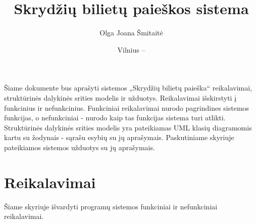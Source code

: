 \documentclass{VUMIFPSkursinis}
\title{Skrydžių bilietų paieškos sistema}
\author{Olga Joana Šmitaitė}
\date{Vilnius – \the\year}
\begin{document}
    \maketitle
      
        \tableofcontents
      
             Šiame dokumente bus aprašyti sistemos „Skrydžių bilietų paieška“ reikalavimai, struktūrinės dalykinės srities modelis ir užduotys. Reikalavimai išskirstyti į funkcinius ir nefunkcinius. Funkciniai reikalavimai nurodo pagrindines sistemos funkcijas, o nefunkciniai - nurodo kaip tas funkcijas sistema turi atlikti. Struktūrinės dalykinės srities modelis yra pateikiamas UML klasių diagramomis kartu su žodynais - sąrašu esybių su jų aprašymais. Paskutiniame skyriuje pateikiamos sistemos užduotys su jų aprašymais.
        \section{Reikalavimai}
			Šiame skyriuje išvardyti programų sistemos funkciniai ir nefunkciniai reikalavimai.
\end{document}
